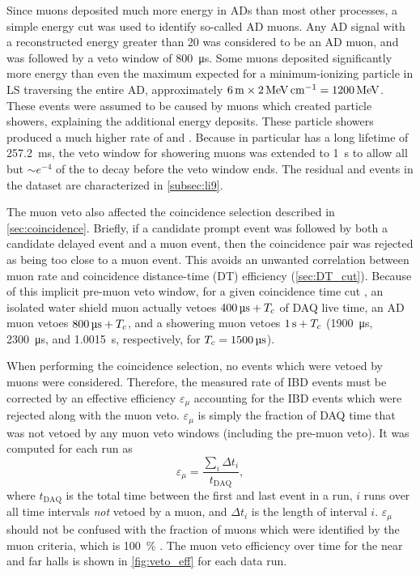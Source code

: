 Since muons deposited much more energy in ADs than most other processes,
a simple energy cut was used to identify so-called AD muons.
Any AD signal with a reconstructed energy greater than \SI{20}{\mev}
was considered to be an AD muon, and was followed by a veto window
of \SI{800}{\micro\second}.
Some muons deposited significantly more energy than
even the maximum expected for a minimum-ionizing particle in LS
traversing the entire AD, approximately
$\SI{6}{\meter}\times\SI{2}{\mev\per\cm}=\SI{1200}{\mev}$.
These events were assumed to be caused by muons which created particle showers,
explaining the additional energy deposits.
These particle showers produced a much higher rate of
\li{} and \he{}.
Because \li{} in particular has a long lifetime of \SI{257.2}{\milli\second},
the veto window for showering muons was extended to \SI{1}{\second}
to allow all but $\sim e^{-4}$ of the \li{} to decay before the veto window ends.
The residual \li{} and \he{} events in the dataset are characterized
in \cref{subsec:li9}.

The muon veto also affected the coincidence selection
described in \cref{sec:coincidence}.
Briefly, if a candidate prompt event was followed
by both a candidate delayed event and a muon event,
then the coincidence pair was rejected as being too close to a muon event.
This avoids an unwanted correlation between muon rate
and coincidence distance-time (DT) efficiency (\cref{sec:DT_cut}).
Because of this implicit pre-muon veto window,
for a given coincidence time cut \tc,
an isolated water shield muon actually vetoes $\SI{400}{\micro\second}+T_c$
of DAQ live time,
an AD muon vetoes $\SI{800}{\micro\second}+T_c$,
and a showering muon vetoes $\SI{1}{\second}+T_c$
(\SI{1900}{\us}, \SI{2300}{\us}, and \SI{1.0015}{\s}, respectively,
for $\tc=\SI{1500}{\us}$).

When performing the coincidence selection, no events which were vetoed by muons
were considered.
Therefore, the measured rate of IBD events
must be corrected by an effective efficiency $\varepsilon_\mu$
accounting for the IBD events which were rejected along with the muon veto.
$\varepsilon_\mu$ is simply the fraction of DAQ time
that was not vetoed by any muon veto windows (including the pre-muon veto).
It was computed for each run as
\begin{equation}
    \varepsilon_\mu = \frac{\sum_i \Delta t_i}{t_{\text{DAQ}}},
\end{equation}
where $t_{\text{DAQ}}$ is the total time
between the first and last event in a run,
$i$ runs over all time intervals \textit{not} vetoed by a muon,
and $\Delta t_i$ is the length of interval $i$.
$\varepsilon_\mu$ should not be confused
with the fraction of muons which were identified by the muon criteria,
which is \SI{100}{\percent} \cite{muonsystem2015}.
The muon veto efficiency over time for the near and far halls
is shown in \cref{fig:veto_eff} for each data run.

